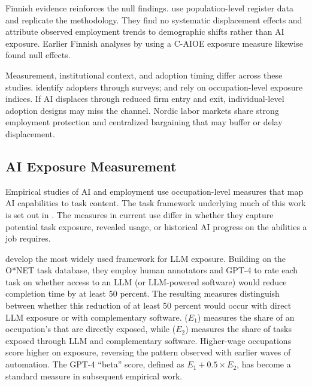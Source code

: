 Finnish evidence reinforces the null findings. \cite{kauhanen2026} use population-level register data and replicate the \cite{brynjolfsson2025} methodology. They find no systematic displacement effects and attribute observed employment trends to demographic shifts rather than AI exposure. Earlier Finnish analyses by \cite{kauhanen2024, kauhanen2025} using a C-AIOE exposure measure likewise found null effects.

Measurement, institutional context, and adoption timing differ across these studies. \cite{humlum2026} identify adopters through surveys; \cite{brynjolfsson2025} and \cite{lodefalk2026} rely on occupation-level exposure indices. If AI displaces through reduced firm entry and exit, individual-level adoption designs may miss the channel. Nordic labor markets share strong employment protection and centralized bargaining that may buffer or delay displacement.


\subsection{AI Exposure Measurement}

Empirical studies of AI and employment use occupation-level measures that map AI capabilities to task content. The task framework underlying much of this work is set out in \citep{autor2003skill, acemoglu2011, acemoglu2018race, acemoglu2019automation}. The measures in current use differ in whether they capture potential task exposure, revealed usage, or historical AI progress on the abilities a job requires.

\cite{eloundou2024} develop the most widely used framework for LLM exposure. Building on the O*NET task database, they employ human annotators and GPT-4 to rate each task on whether access to an LLM (or LLM-powered software) would reduce completion time by at least 50 percent. The resulting measures distinguish between whether this reduction of at least 50 percent would occur with direct LLM exposure or with complementary software. ($E_1$) measures the share of an occupation's that are directly exposed, while ($E_2$) measures the share of tasks exposed through LLM and complementary software. Higher-wage occupations score higher on exposure, reversing the pattern observed with earlier waves of automation. The GPT-4 ``beta'' score, defined as $E_1 + 0.5 \times E_2$, has become a standard measure in subsequent empirical work.

